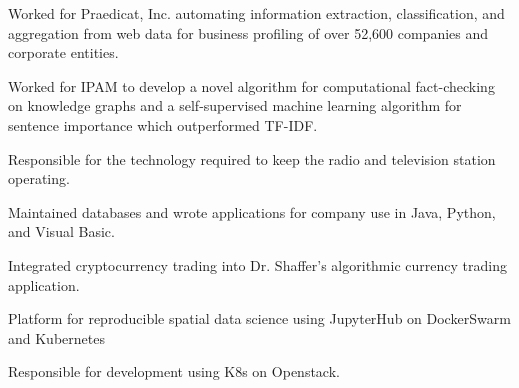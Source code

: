 \documentclass{acmresume}
\begin{document}
        \begin{titemize}
            \item{Worked for Praedicat, Inc. automating information extraction, classification, and aggregation from web data for business profiling of over 52,600 companies and corporate entities.}
            \item{Worked for IPAM to develop a novel algorithm for computational fact-checking on knowledge graphs and a self-supervised machine learning algorithm for sentence importance which outperformed TF-IDF.}
        \end{titemize}

        \begin{titemize}
            \item{Responsible for the technology required to keep the radio and television station operating.}
        \end{titemize}
		
        \begin{titemize}
            \item{Maintained databases and wrote applications for company use in Java, Python, and Visual Basic.}
        \end{titemize}

        \begin{titemize}
            \item Integrated cryptocurrency trading into Dr. Shaffer's algorithmic currency trading application.
        \end{titemize}
		
	
        
        \begin{titemize}
            \item Platform for reproducible spatial data science using JupyterHub on DockerSwarm and Kubernetes
            \item Responsible for development using K8s on Openstack.
        \end{titemize}
		
\end{document}
